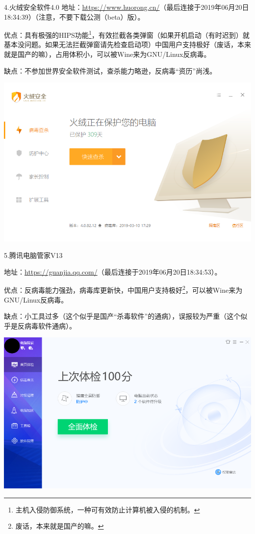 \documentclass{book}
\begin{document}
4.火绒安全软件4.0
地址：\url{https://www.huorong.cn/}（最后连接于2019年06月20日18:34:39）（注意，不要下载公测（beta）版）。\par
优点：具有极强的HIPS功能\footnote{主机入侵防御系统，一种可有效防止计算机被入侵的机制。}，有效拦截各类弹窗（如果开机启动（有时迟到）就基本没问题。如果无法拦截弹窗请先检查启动项）中国用户支持极好（废话，本来就是国产的嘛），占用体积小，可以被Wine来为GNU/Linux反病毒。\par
缺点：不参加世界安全软件测试，查杀能力略逊，反病毒“资历”尚浅。
\begin{center}
	\includegraphics[scale=0.6]{pic/huorong}
\end{center}
5.腾讯电脑管家V13\par
地址：\url{https://guanjia.qq.com/}（最后连接于2019年06月20日18:34:53）。\par
优点：反病毒能力强劲，病毒库更新快，中国用户支持极好\footnote{废话，本来就是国产的嘛。}，可以被Wine来为GNU/Linux反病毒。\par
缺点：小工具过多（这个似乎是国产“杀毒软件”的通病），误报较为严重（这个似乎是反病毒软件通病）。
\begin{center}
	\includegraphics[scale=0.5]{pic/tsav}
\end{center}
\end{document}
